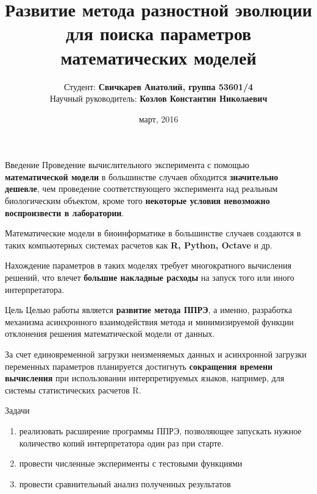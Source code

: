 \documentclass{beamer}
\begin{document}
\title[Развитие ППРЭ]
{Развитие метода разностной эволюции
для поиска параметров математических моделей}
\author[Свичкарев Анатолий]
{Студент: \textbf{Свичкарев Анатолий, группа 53601/4}\\
Научный руководитель: \textbf{Козлов Константин Николаевич}}
\date{март, 2016}

\frame{\titlepage} 

\begin{frame}{Введение}
    Проведение вычислительного эксперимента
    с помощью \textbf{математической модели}
    в большинстве случаев обходится \textbf{значительно дешевле},
    чем проведение соответствующего эксперимента
    над реальным биологическим объектом,
    кроме того \textbf{некоторые условия
    невозможно воспроизвести в лаборатории}.
    \bigskip

    Математические модели в биоинформатике в
    большинстве случаев создаются в таких компьютерных
    системах расчетов как \textbf{R, Python, Octave} и др.
    \bigskip

    Нахождение параметров в таких моделях требует
    многократного вычисления решений, что влечет
    \textbf{большие накладные расходы} на запуск того или иного
    интерпретатора.
\end{frame}

\begin{frame}{Цель}
Целью работы является
\textbf{развитие метода ППРЭ},
а именно, разработка механизма
асинхронного взаимодействия метода
и минимизируемой функции отклонения
решения математической модели от данных.

\bigskip
За счет единовременной загрузки
неизменяемых данных и
асинхронной загрузки переменных параметров
планируется достигнуть
\textbf{сокращения времени вычисления}
при использовании
интерпретируемых языков, например,
для системы статистических расчетов R.
\end{frame}

\begin{frame}{Задачи}
\begin{enumerate}
    \itemsep 2em
    \item реализовать расширение программы ППРЭ,
        позволяющее запускать нужное количество копий
        интерпретатора один раз при старте.
    \item провести численные эксперименты с тестовыми функциями
    \item провести сравнительный анализ полученных результатов
\end{enumerate}
\end{frame}
\end{document}
